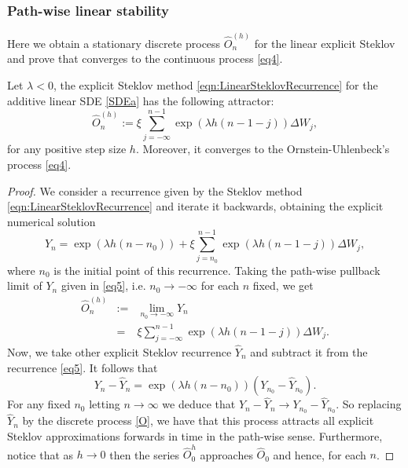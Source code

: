 	\subsubsection{Path-wise linear stability}
		Here we obtain a stationary discrete process $\widehat{O}_n^{(h)}$ for the linear explicit
		Steklov  and  prove that converges to the continuous process \eqref{eq4}. 
	\begin{pro}
		Let $\lambda<0$, the explicit Steklov method \eqref{eqn:LinearSteklovRecurrence} for
		the additive linear SDE \eqref{SDEa} has the following attractor: 
		\begin{equation}\label{O}
			\widehat{O}_n^{(h)}  :=
			\xi \sum_{j=-\infty}^{n-1}\exp(\lambda h(n-1-j)) \Delta W_j,
		\end{equation}
		for any positive step size $h$. Moreover, it converges to the Ornstein-Uhlenbeck's
		process \eqref{eq4}.
	\end{pro}
	\begin{proof}
		We consider a recurrence given  by the Steklov method
		\eqref{eqn:LinearSteklovRecurrence} and iterate it backwards, obtaining the explicit
		numerical solution
		\begin{equation}
		Y_n= \exp(\lambda h(n-n_0))+\xi\sum_{j=n_0}^{n-1}
		\exp(\lambda h(n-1-j))\Delta W_j, \label{eq5}
		\end{equation}
		where $n_0$ is the initial point of this recurrence. Taking the path-wise pullback
		limit of $Y_n$ given in \eqref{eq5}, i.e. $n_0\to -\infty$ for each $n$ fixed, we get
		\begin{eqnarray}
		\widehat{O}_n^{(h)}  &:=&  \lim_{n_0 \to -\infty} Y_n
		\nonumber  \\
		&=& \xi \sum_{j=-\infty}^{n-1}\exp(\lambda h(n-1-j)) \Delta W_j.
		\nonumber
		\end{eqnarray}
		Now, we take other explicit Steklov recurrence $\widehat{Y}_n$ and subtract it from
		the recurrence \eqref{eq5}. It follows that
		$$
		Y_n-\widehat{Y}_n=\exp(\lambda h(n-n_0))(Y_{n_0}-
		\widehat{Y}_{n_0}).
		$$
		For any fixed $n_0$ letting $n\to \infty$ we deduce that
		$Y_n-\widehat{Y}_n\to Y_{n_0}-\widehat{Y}_{n_0}$. So replacing $\widehat{Y}_n$ by the
		discrete process \eqref{O}, we have that this process attracts all explicit Steklov
		approximations forwards in time in the path-wise sense. Furthermore, notice that as
		$h\to 0$ then  the series $\widehat{O}^{h}_0$ approaches $\widehat{O}_0$ and hence,
		for each $n$.
	\end{proof}